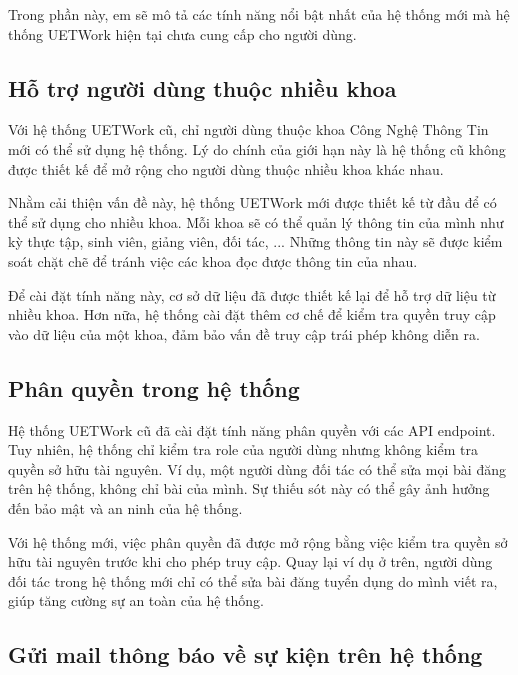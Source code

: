 \documentclass[./../main.tex]{subfiles}
\begin{document}
Trong phần này, em sẽ mô tả các tính năng nổi bật nhất của hệ thống mới
mà hệ thống UETWork hiện tại chưa cung cấp cho người dùng.

\hypertarget{hux1ed7-trux1ee3-ngux1b0ux1eddi-duxf9ng-thuux1ed9c-nhiux1ec1u-khoa}{%
\subsection{Hỗ trợ người dùng thuộc nhiều
khoa}\label{hux1ed7-trux1ee3-ngux1b0ux1eddi-duxf9ng-thuux1ed9c-nhiux1ec1u-khoa}}

Với hệ thống UETWork cũ, chỉ người dùng thuộc khoa Công Nghệ Thông Tin mới có thể sử dụng hệ thống. Lý do chính của giới hạn này là hệ thống cũ không được thiết kế để mở rộng cho người dùng thuộc nhiều khoa khác nhau.

Nhằm cải thiện vấn đề này, hệ thống UETWork mới được thiết kế từ đầu để có thể sử dụng cho nhiều khoa. Mỗi khoa sẽ có thể quản lý thông tin của mình như kỳ thực tập, sinh viên, giảng viên, đối tác, ... Những thông tin này sẽ được kiểm soát chặt chẽ để tránh việc các khoa đọc được thông tin của nhau.

Để cài đặt tính năng này, cơ sở dữ liệu đã được thiết kế lại để hỗ trợ dữ liệu từ nhiều khoa. Hơn nữa, hệ thống cài đặt thêm cơ chế để kiểm tra quyền truy cập vào dữ liệu của một khoa, đảm bảo vấn đề truy cập trái phép không diễn ra.

\hypertarget{phuxe2n-quyux1ec1n-trong-hux1ec7-thux1ed1ng}{%
\subsection{Phân quyền trong hệ
thống}\label{phuxe2n-quyux1ec1n-trong-hux1ec7-thux1ed1ng}}

Hệ thống UETWork cũ đã cài đặt tính năng phân quyền với các API endpoint. Tuy nhiên, hệ thống chỉ kiểm tra role của người dùng nhưng không kiểm tra quyền sở hữu tài nguyên. Ví dụ, một người dùng đối tác có thể sửa mọi bài đăng trên hệ thống, không chỉ bài của mình. Sự thiếu sót này có thể gây ảnh hưởng đến bảo mật và an ninh của hệ thống.

Với hệ thống mới, việc phân quyền đã được mở rộng bằng việc kiểm tra quyền sở hữu tài nguyên trước khi cho phép truy cập. Quay lại ví dụ ở trên, người dùng đối tác trong hệ thống mới chỉ có thể sửa bài đăng tuyển dụng do mình viết ra, giúp tăng cường sự an toàn của hệ thống.

\hypertarget{gux1eedi-mail-thuxf4ng-buxe1o-vux1ec1-sux1ef1-kiux1ec7n-truxean-hux1ec7-thux1ed1ng}{%
\subsection{Gửi mail thông báo về sự kiện trên hệ
thống}\label{gux1eedi-mail-thuxf4ng-buxe1o-vux1ec1-sux1ef1-kiux1ec7n-truxean-hux1ec7-thux1ed1ng}}
\end{document}
